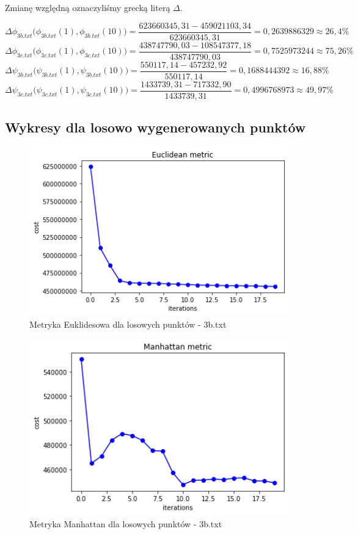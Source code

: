 \documentclass{classrep}
\begin{document}
Zmianę względną oznaczyliśmy grecką literą $\Delta$.

\small{
\[ \Delta \phi_{3b.txt} \Big(  \phi_{3b.txt}(1), \phi_{3b.txt}(10) \Big) = \frac{623 660 345,31 - 459 021 103,34}{623 660 345,31} = 0,2639886329 \approx 26,4\% \] 
\[ \Delta \phi_{3c.txt} \Big(  \phi_{3c.txt}(1), \phi_{3c.txt}(10) \Big) = \frac{438 747 790,03 - 108 547 377,18}{438 747 790,03} = 0,7525973244 \approx 75,26\% \]
\[ \Delta \psi_{3b.txt} \Big(  \psi_{3b.txt}(1), \psi_{3b.txt}(10) \Big) = \frac{550 117,14 - 457 232,92}{550 117,14} = 0,1688444392 \approx 16,88\% \]
\[ \Delta \psi_{3c.txt} \Big(  \psi_{3c.txt}(1), \psi_{3c.txt}(10) \Big) = \frac{1 433 739,31 - 717 332,90}{1 433 739,31} = 0,4996768973 \approx 49,97\% \]
}
\subsection{Wykresy dla losowo wygenerowanych punktów}
\begin{figure}[H]
        \centering
        \includegraphics[width=1\textwidth]{images/images3/RandomEuclidean.png}
        \caption{Metryka Euklidesowa dla losowych punktów - 3b.txt}
        \label{fig1}
    \end{figure}
\begin{figure}[H]
        \centering
        \includegraphics[width=1\textwidth]{images/images3/RandomManhattan.png}
        \caption{Metryka Manhattan dla losowych punktów - 3b.txt}
        \label{fig2}
    \end{figure}
\end{document}
